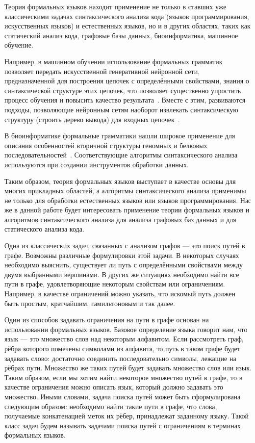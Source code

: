 
Теория формальных языков находит применение не только в ставших уже классическими задачах синтаксического анализа кода (языков программирования, искусственных языков) и естественных языков, но и в других областях, таких как статический анализ кода, графовые базы данных, биоинформатика, машинное обучение.

Например, в машинном обучении использование формальных грамматик позволяет передать искусственной генеративной нейронной сети, предназначенной для построения цепочек с определёнными свойствами, знания о синтаксической структуре этих цепочек, что позволяет существенно упростить процесс обучения и повысить качество результата~.
Вместе с этим, развиваются подходы, позволяющие нейронным сетям наоборот извлекать синтаксическую структуру (строить дерево вывода) для входных цепочек~.

В биоинформатике формальные грамматики нашли широкое применение для описания особенностей вторичной структуры геномных и белковых последовательностей~.
Соответствующие алгоритмы синтаксического анализа используются при создании инструментов обработки данных.

Таким образом, теория формальных языков выступает в качестве основы для многих прикладных областей, а алгоритмы синтаксического анализа применимы не только для обработки естественных языков или языков программирования.
Нас же в данной работе будет интересовать применение теории формальных языков и алгоритмов синтаксического анализа для анализа графовых баз данных и для статического анализа кода.

Одна из классических задач, связанных с анализом графов --- это поиск путей в графе.
Возможны различные формулировки этой задачи.
В некоторых случаях необходимо выяснить, существует ли путь с определёнными свойствами между двумя выбранными вершинами.
В других же ситуациях необходимо найти все пути в графе, удовлетворяющие некоторым свойствам или ограничениям.
Например, в качестве ограничений можно указать, что искомый путь должен быть простым, кратчайшим, гамильтоновым и так далее.

Один из способов задавать ограничения на пути в графе основан на использовании формальных языков.
Базовое определение языка говорит нам, что язык --- это множество слов над некоторым алфавитом.
Если рассмотреть граф, рёбра которого помечены символами из алфавита, то путь в таком графе будет задавать слово: достаточно соединить последовательно символы, лежащие на рёбрах пути.
Множество же таких путей будет задавать множество слов или язык.
Таким образом, если мы хотим найти некоторое множество путей в графе, то в качестве ограничения можно описать язык, который должно задавать это множество.
Иными словами, задача поиска путей может быть сформулирована следующим образом: необходимо найти такие пути в графе, что слова, получаемые конкатенацией меток их рёбер, принадлежат заданному языку.
Такой класс задач будем называть задачами поиска путей с ограничениям в терминах формальных языков.

